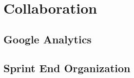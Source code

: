 \chapter{Collaboration}\label{chap:collaboration}


\section{Google Analytics}


\section{Sprint End Organization}\label{sec:collab:sprintend}
